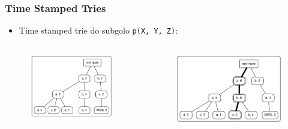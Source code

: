 \documentclass{beamer}
\begin{document}
\begin{frame}
  \frametitle{Time Stamped Tries}
  \begin{itemize}
    \item Time stamped trie do subgolo \texttt{p(X, Y, Z)}:
  \end{itemize}
  \begin{columns}[t]
      \begin{example}[antes]
        \begin{figure}[ht]
          \centering
            \includegraphics[scale=0.4]{tst_1.pdf}
        \end{figure}
      \end{example}
      \begin{example}
        \begin{figure}[ht]
          \centering
            \includegraphics[scale=0.4]{tst_2.pdf}
        \end{figure}
      \end{example}
  \end{columns}
\end{frame}
\end{document}
